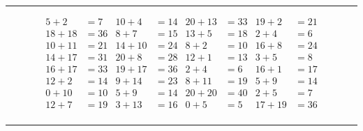 \documentclass{article}
\begin{document}
\begin{sloppy}
\hrule
\begin{align*}
    {5} + {2} &= {7} & {10} + {4} &= {14} & {20} + {13} &= {33} & {19} + {2} &= {21} \\
    {18} + {18} &= {36} & {8} + {7} &= {15} & {13} + {5} &= {18} & {2} + {4} &= {6} \\
    {10} + {11} &= {21} & {14} + {10} &= {24} & {8} + {2} &= {10} & {16} + {8} &= {24} \\
    {14} + {17} &= {31} & {20} + {8} &= {28} & {12} + {1} &= {13} & {3} + {5} &= {8} \\
    {16} + {17} &= {33} & {19} + {17} &= {36} & {2} + {4} &= {6} & {16} + {1} &= {17} \\
    {12} + {2} &= {14} & {9} + {14} &= {23} & {8} + {11} &= {19} & {5} + {9} &= {14} \\
    {0} + {10} &= {10} & {5} + {9} &= {14} & {20} + {20} &= {40} & {2} + {5} &= {7} \\
    {12} + {7} &= {19} & {3} + {13} &= {16} & {0} + {5} &= {5} & {17} + {19} &= {36} \\
\end{align*}
\hrule
\end{sloppy}
\end{document}
